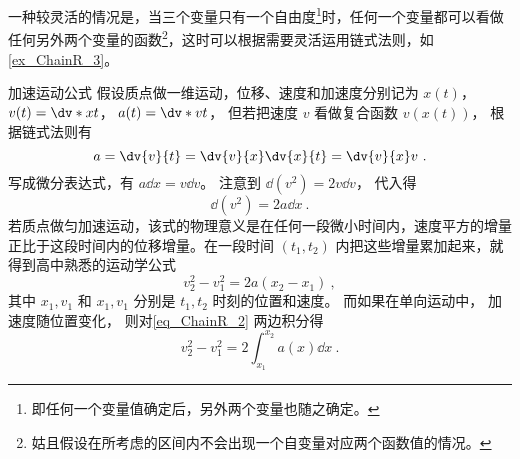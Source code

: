 一种较灵活的情况是，当三个变量只有一个自由度\footnote{即任何一个变量值确定后，另外两个变量也随之确定。}时，任何一个变量都可以看做任何另外两个变量的函数\footnote{姑且假设在所考虑的区间内不会出现一个自变量对应两个函数值的情况。}，这时可以根据需要灵活运用链式法则，如\autoref{ex_ChainR_3}。

\begin{example}{加速运动公式}\label{ex_ChainR_3}
假设质点做一维运动，位移、速度和加速度分别记为 $x(t)$，  $v(t) = \dv*{x}{t}$，  $a(t) = \dv*{v}{t}$， 但若把速度 $v$ 看做复合函数 $v(x(t))$， 根据链式法则有
\begin{equation}
a = \dv{v}{t} = \dv{v}{x}\dv{x}{t} = \dv{v}{x}v~.
\end{equation}
写成微分表达式，有 $a\dd{x} = v\dd{v}$。 注意到 $\dd (v^2) = 2v\dd{v}$， 代入得
\begin{equation}\label{eq_ChainR_2}
\dd(v^2) = 2a \dd{x}~.
\end{equation}
若质点做匀加速运动，该式的物理意义是在任何一段微小时间内，速度平方的增量正比于这段时间内的位移增量。在一段时间 $(t_1,t_2)$ 内把这些增量累加起来，就得到高中熟悉的运动学公式
\begin{equation}
v_2^2-v_1^2 = 2a(x_2-x_1)~,
\end{equation}
其中 $x_1,v_1$ 和 $x_1,v_1$ 分别是 $t_1,t_2$ 时刻的位置和速度。 而如果在单向运动中， 加速度随位置变化， 则对\autoref{eq_ChainR_2} 两边积分得
\begin{equation}
v_2^2 - v_1^2 = 2\int_{x_1}^{x_2}a(x)\dd{x}~.
\end{equation}
\end{example}

